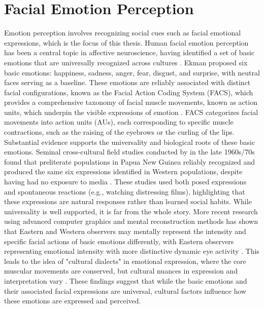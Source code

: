 \section{Facial Emotion Perception}
Emotion perception involves recognizing social cues such as facial emotional expressions, which is the focus of this thesis.
Human facial emotion perception has been a central topic in affective neuroscience, having identified a set of basic emotions that are universally recognized across cultures \citep{ekman1971constants}. 
Ekman proposed six basic emotions: happiness, sadness, anger, fear, disgust, and surprise, with neutral faces serving as a baseline. 
These emotions are reliably associated with distinct facial configurations, known as the Facial Action Coding System (FACS), which provides a comprehensive taxonomy of facial muscle movements, known as action units, which underpin the visible expressions of emotion \citep{ekman1978facial}. 
FACS categorizes facial movements into action units (AUs), each corresponding to specific muscle contractions, such as the raising of the eyebrows or the curling of the lips.
Substantial evidence supports the universality and biological roots of these basic emotions. 
Seminal cross-cultural field studies conducted by in the late 1960s/70s found that preliterate populations in Papua New Guinea reliably recognized and produced the same six expressions identified in Western populations, despite having had no exposure to media \citep{matsumoto_half-century_2022}. 
These studies used both posed expressions and spontaneous reactions (e.g., watching distressing films), highlighting that these expressions are natural responses rather than learned social habits. 
While universality is well supported, it is far from the whole story.
More recent research using advanced computer graphics and mental reconstruction methods has shown that Eastern and Western observers may mentally represent the intensity and specific facial actions of basic emotions differently, with Eastern observers representing emotional intensity with more distinctive dynamic eye activity  \citep{jack_facial_2012}. 
This leads to the idea of "cultural dialects" in emotional expression, where the core muscular movements are conserved, but cultural nuances in expression and interpretation vary \citep{ruttkay_cultural_2009}. 
These findings suggest that while the basic emotions and their associated facial expressions are universal, cultural factors influence how these emotions are expressed and perceived.

